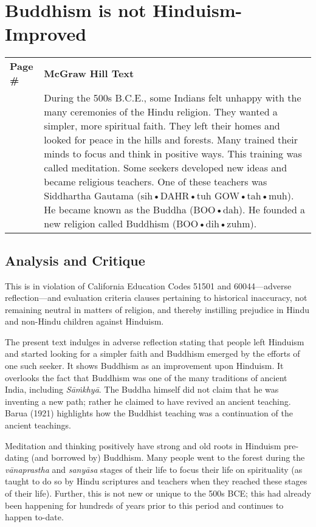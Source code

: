 \chapter{Buddhism is not Hinduism-Improved}

\begin{longtable}{|>{\raggedleft}p{1.5cm}|p{8.5cm}|}
\multicolumn{2}{c}{\textbf{Table: 1}}\\ 
\hline
\textbf{Page \#} & \textbf{McGraw Hill Text} \tabularnewline
\hline 
264 & During the 500s B.C.E., some Indians felt unhappy with the many ceremonies of the Hindu religion. They wanted a simpler, more spiritual faith. They left their homes and looked for peace in the hills and forests. Many trained their minds to focus and think in positive ways. This training was called meditation. Some seekers developed new ideas and became religious teachers. One of these teachers was Siddhartha Gautama (sih•DAHR•tuh GOW•tah•muh). He became known as the Buddha (BOO•dah). He founded a new religion called Buddhism (BOO•dih•zuhm).\tabularnewline
\hline
\end{longtable}

\section*{Analysis and Critique} 

This is in violation of California Education Codes 51501 and 60044—adverse reflection—and evaluation criteria clauses pertaining to historical inaccuracy, not remaining neutral in matters of religion, and thereby instilling prejudice in Hindu and non-Hindu children against Hinduism.

The present text indulges in adverse reflection stating that people left Hinduism and started looking for a simpler faith and Buddhism emerged by the efforts of one such seeker. It shows Buddhism as an improvement upon Hinduism. It overlooks the fact that Buddhism was one of the many traditions of ancient India, including \textit{Sāṁkhyā}. The Buddha himself did not claim that he was inventing a new path; rather he claimed to have revived an ancient teaching. Barua (1921) highlights how the Buddhist teaching was a continuation of the ancient teachings. 

Meditation and thinking positively have strong and old roots in Hinduism pre-dating (and borrowed by) Buddhism. Many people went to the forest during the \textit{vānaprastha} and \textit{sanyāsa} stages of their life to focus their life on spirituality (as taught to do so by Hindu scriptures and teachers when they reached these stages of their life). Further, this is not new or unique to the 500s BCE; this had already been happening for hundreds of years prior to this period and continues to happen to-date.

